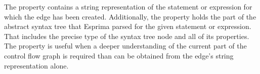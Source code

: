 The  property contains a string representation of the statement or expression for which the edge has been created. Additionally, the  property holds the part of the abstract syntax tree that Esprima parsed for the given statement or expression. That includes the precise type of the syntax tree node and all of its properties. The  property is useful when a deeper understanding of the current part of the control flow graph is required than can be obtained from the edge's string representation alone.
